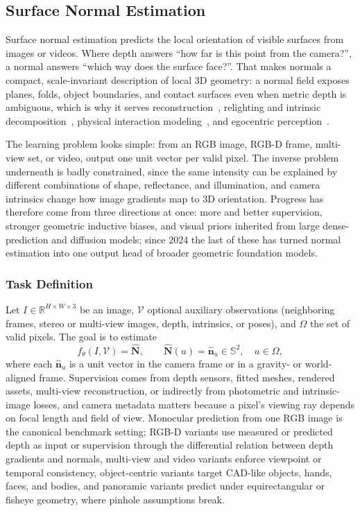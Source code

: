 \subsection{Surface Normal Estimation}
\label{sec:surface_normal}

Surface normal estimation predicts the local orientation of visible surfaces from images or videos.
Where depth answers ``how far is this point from the camera?'', a normal answers ``which way does the surface face?''.
That makes normals a compact, scale-invariant description of local 3D geometry: a normal field exposes planes, folds, object boundaries, and contact surfaces even when metric depth is ambiguous, which is why it serves reconstruction~\cite{wang2021neus}, relighting and intrinsic decomposition~\cite{munkberg2022extracting,barron2015shape}, physical interaction modeling~\cite{Bear2021Physion}, and egocentric perception~\cite{grauman2022ego4d}.

The learning problem looks simple: from an RGB image, RGB-D frame, multi-view set, or video, output one unit vector per valid pixel.
The inverse problem underneath is badly constrained, since the same intensity can be explained by different combinations of shape, reflectance, and illumination, and camera intrinsics change how image gradients map to 3D orientation.
Progress has therefore come from three directions at once: more and better supervision, stronger geometric inductive biases, and visual priors inherited from large dense-prediction and diffusion models; since 2024 the last of these has turned normal estimation into one output head of broader geometric foundation models.



\subsubsection{Task Definition}
Let $I\in\mathbb{R}^{H\times W\times 3}$ be an image, $\mathcal{V}$ optional auxiliary observations (neighboring frames, stereo or multi-view images, depth, intrinsics, or poses), and $\Omega$ the set of valid pixels.
The goal is to estimate
\begin{equation}
    f_\theta(I,\mathcal{V}) = \hat{\mathbf{N}}, \qquad
    \hat{\mathbf{N}}(u) = \hat{\mathbf{n}}_u \in \mathbb{S}^2,\quad u\in\Omega,
\end{equation}
where each $\hat{\mathbf{n}}_u$ is a unit vector in the camera frame or in a gravity- or world-aligned frame.
Supervision comes from depth sensors, fitted meshes, rendered assets, multi-view reconstruction, or indirectly from photometric and intrinsic-image losses, and camera metadata matters because a pixel's viewing ray depends on focal length and field of view.
Monocular prediction from one RGB image is the canonical benchmark setting; RGB-D variants use measured or predicted depth as input or supervision through the differential relation between depth gradients and normals, multi-view and video variants enforce viewpoint or temporal consistency, object-centric variants target CAD-like objects, hands, faces, and bodies, and panoramic variants predict under equirectangular or fisheye geometry, where pinhole assumptions break.


